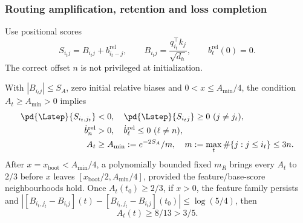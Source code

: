 \subsubsection{Routing amplification, retention and loss completion}
\label{app:weak-routing-convergence}

Use positional scores
\begin{equation}\label{eq:lr-relative-scores}
 S_{i_tj}=B_{i_tj}+b_{i_t-j}^{\mathrm{rel}},
 \qquad
 B_{i_tj}=\frac{q_{i_t}^\top k_j}{\sqrt{d_h}},
 \qquad b_\ell^{\mathrm{rel}}(0)=0.
\end{equation}
The correct offset $n$ is not privileged at initialization.

\begin{lemma}
\label{lem:lr-bias-learning}\label{lem:lr-post-routing}
With $|B_{i_tj}|\le S_A$, zero initial relative biases and
$0<x\le A_{\min}/4$, the condition $A_t\ge A_{\min}>0$ implies
\begin{align}
 \pd{\Lstep}{S_{i_t,j_t}}&<0,\quad \pd{\Lstep}{S_{i_tj}}\ge0\ (j\ne j_t),
 \label{eq:lr-smallscore-sign}\\
 \dot b_n^{\mathrm{rel}}&>0,\quad \dot b_\ell^{\mathrm{rel}}\le0\ (\ell\ne n),
 \label{eq:lr-beta-routes}\\
 A_t&\ge A_{\min}:=e^{-2S_A}/m,\quad
 m:=\max_t\#\{j:j\le i_t\}\le3n.\label{eq:lr-floor}
\end{align}
After $x=x_{\mathrm{boot}}<A_{\min}/4$, a polynomially bounded fixed $m_R$
brings every $A_t$ to $2/3$ before $x$ leaves
$[x_{\mathrm{boot}}/2,A_{\min}/4]$, provided the feature/base-score
neighbourhoods hold. Once $A_t(t_0)\ge2/3$, if $x>0$, the feature family
persists and
$|[B_{i_t,j_t}-B_{i_tj}](t)-[B_{i_t,j_t}-B_{i_tj}](t_0)|\le\log(5/4)$,
then
\begin{equation}\label{eq:lr-post-floor}
 A_t(t)\ge8/13>3/5.
\end{equation}
\end{lemma}
